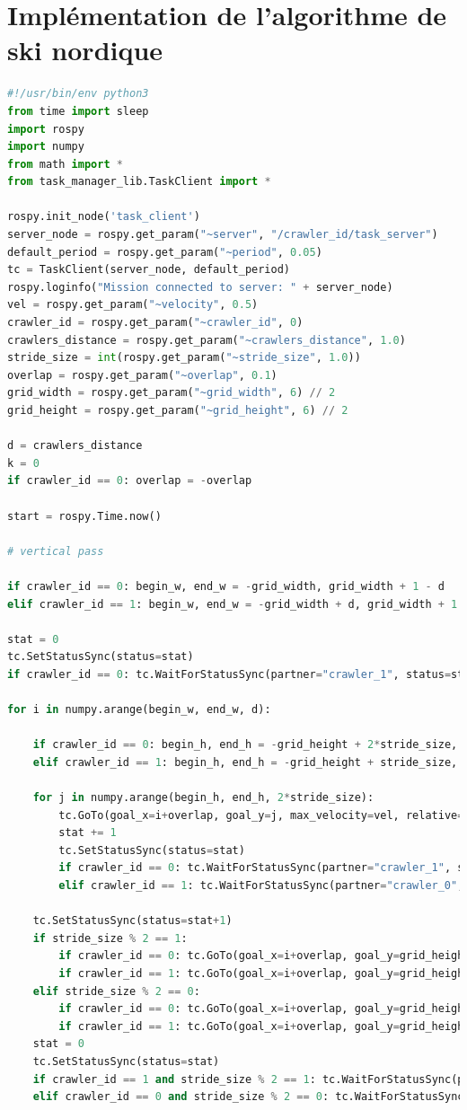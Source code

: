 \documentclass[francais,RandD]{rapportPFE}
\begin{document}
	\section{Implémentation de l'algorithme de ski nordique}
		\begin{lstlisting}[language=Python,caption={Implémentation de l'algorithme de ski nordique},label=lst:ski_nordique]
#!/usr/bin/env python3
from time import sleep
import rospy
import numpy
from math import *
from task_manager_lib.TaskClient import *

rospy.init_node('task_client')
server_node = rospy.get_param("~server", "/crawler_id/task_server")
default_period = rospy.get_param("~period", 0.05)
tc = TaskClient(server_node, default_period)
rospy.loginfo("Mission connected to server: " + server_node)
vel = rospy.get_param("~velocity", 0.5)
crawler_id = rospy.get_param("~crawler_id", 0)
crawlers_distance = rospy.get_param("~crawlers_distance", 1.0)
stride_size = int(rospy.get_param("~stride_size", 1.0))
overlap = rospy.get_param("~overlap", 0.1)
grid_width = rospy.get_param("~grid_width", 6) // 2
grid_height = rospy.get_param("~grid_height", 6) // 2

d = crawlers_distance
k = 0
if crawler_id == 0: overlap = -overlap

start = rospy.Time.now()

# vertical pass

if crawler_id == 0: begin_w, end_w = -grid_width, grid_width + 1 - d
elif crawler_id == 1: begin_w, end_w = -grid_width + d, grid_width + 1

stat = 0
tc.SetStatusSync(status=stat)
if crawler_id == 0: tc.WaitForStatusSync(partner="crawler_1", status=stat+1)

for i in numpy.arange(begin_w, end_w, d):

	if crawler_id == 0: begin_h, end_h = -grid_height + 2*stride_size, grid_height + 1 + stride_size
	elif crawler_id == 1: begin_h, end_h = -grid_height + stride_size, grid_height + 1 + stride_size

	for j in numpy.arange(begin_h, end_h, 2*stride_size):
		tc.GoTo(goal_x=i+overlap, goal_y=j, max_velocity=vel, relative=False)
		stat += 1
		tc.SetStatusSync(status=stat)
		if crawler_id == 0: tc.WaitForStatusSync(partner="crawler_1", status=stat+1)
		elif crawler_id == 1: tc.WaitForStatusSync(partner="crawler_0", status=stat)

	tc.SetStatusSync(status=stat+1)
	if stride_size % 2 == 1:
		if crawler_id == 0: tc.GoTo(goal_x=i+overlap, goal_y=grid_height + stride_size, max_velocity=vel, relative=False)
		if crawler_id == 1: tc.GoTo(goal_x=i+overlap, goal_y=grid_height, max_velocity=vel, relative=False)
	elif stride_size % 2 == 0:
		if crawler_id == 0: tc.GoTo(goal_x=i+overlap, goal_y=grid_height, max_velocity=vel, relative=False)
		if crawler_id == 1: tc.GoTo(goal_x=i+overlap, goal_y=grid_height + stride_size, max_velocity=vel, relative=False)
	stat = 0
	tc.SetStatusSync(status=stat)
	if crawler_id == 1 and stride_size % 2 == 1: tc.WaitForStatusSync(partner="crawler_0", status=stat+1)
	elif crawler_id == 0 and stride_size % 2 == 0: tc.WaitForStatusSync(partner="crawler_1", status=stat+1)


\end{lstlisting}
\end{document}
